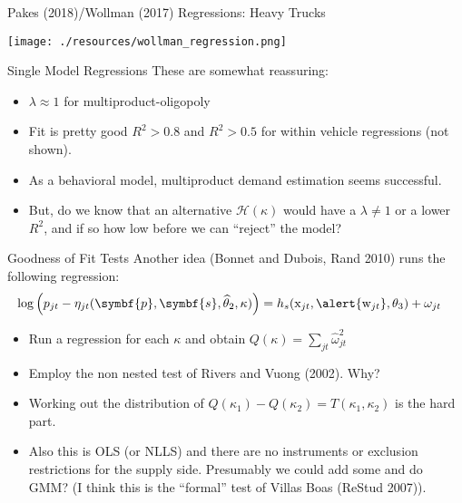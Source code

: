 \documentclass[aspectratio=169,10pt]{beamer}
\begin{document}
\begin{frame}{Pakes (2018)/Wollman (2017) Regressions: Heavy Trucks}
\begin{center}
\texttt{[image: ./resources/wollman\_regression.png]}
\end{center}
\end{frame}

\begin{frame}{Single Model Regressions}
These are somewhat reassuring:
\begin{itemize}
\item $\lambda\approx 1$ for multiproduct-oligopoly
\item Fit is pretty good $R^2 > 0.8$ and $R^2 > 0.5$ for within vehicle regressions (not shown).
\item As a behavioral model, multiproduct demand estimation seems successful.
\item But, do we know that an alternative $\mathcal{H}(\kappa)$ would have a $\lambda \neq 1$ or a lower $R^2$, and if so how low before we can ``reject'' the model?
\end{itemize}
\end{frame}

\begin{frame}{Goodness of Fit Tests}
Another idea (Bonnet and Dubois, Rand 2010) runs the following regression:
\begin{align*}
\log \left( p_{jt} - \eta_{jt}(\symbf{p},\symbf{s},\widehat{\theta}_2,\kappa) \right) &= h_s(\textrm{x}_{jt}, \alert{\textrm{w}_{jt}},\theta_3) + \omega_{jt}
\end{align*}
\begin{itemize}
\item Run a regression for each $\kappa$ and obtain $Q(\kappa)=\sum_{jt} \widehat{\omega}_{jt}^2$
\item Employ the \alert{non nested test} of Rivers and Vuong (2002). Why?
\item Working out the distribution of $Q(\kappa_1) - Q(\kappa_2)=T(\kappa_1,\kappa_2)$ is the hard part.
\item Also this is OLS (or NLLS) and there are no instruments or \alert{exclusion restrictions} for the supply side. Presumably we could add some and do GMM? (I think this is the ``formal'' test of Villas Boas (ReStud 2007)).
\end{itemize}
\end{frame}
\end{document}
